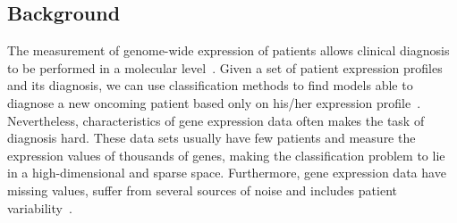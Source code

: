 \documentclass[10pt]{bmc_article}
\newenvironment{bmcformat}{\begin{raggedright}\baselineskip20pt\sloppy\setboolean{publ}{false}}{\end{raggedright}\baselineskip20pt\sloppy}
\begin{document}
\begin{bmcformat}
\begin{abstract}
\end{abstract}











\section*{Background}

The measurement of genome-wide expression of patients allows clinical
diagnosis to be performed in a molecular
level~\cite{Spang2003,Veer2008}. Given a set of patient expression
profiles and its diagnosis, we can use classification methods to find
models able to diagnose a new oncoming patient based only on his/her
expression profile~\cite{Spang2003}. Nevertheless, characteristics of
gene expression data often makes the task of diagnosis hard. These
data sets usually have few patients and measure the expression values
of thousands of genes, making the classification problem to lie in a
high-dimensional and sparse space. Furthermore, gene expression data
have missing values, suffer from several sources of noise and includes
patient variability~\cite{Irizarry2005}.


\end{bmcformat}
\end{document}

